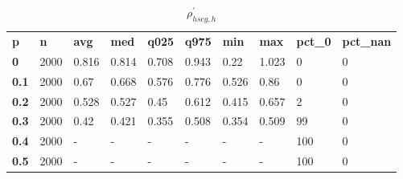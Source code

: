 \begin{table}[h]
 \centering 
\footnotesize
\caption{$\rho_{hscg,h}^\prime $}
\label{tab:alphahscgh}
\begin{tabular}[h]{| l l l l l l l l l l|
    } \hline
\textbf{ p} & \textbf{ n} & \textbf{ avg} & \textbf{ med} & \textbf{ q025} & \textbf{ q975} & \textbf{ min} & \textbf{ max} & \textbf{ pct\_0} & \textbf{ pct\_nan}
           \\
  \textbf{  0} & 2000 & 0.816 & 0.814 & 0.708 & 0.943 &  0.22 & 1.023 &   0 & 0
           \\
  \textbf{0.1} & 2000 &  0.67 & 0.668 & 0.576 & 0.776 & 0.526 &  0.86 &   0 & 0
           \\
  \textbf{0.2} & 2000 & 0.528 & 0.527 &  0.45 & 0.612 & 0.415 & 0.657 &   2 & 0
           \\
  \textbf{0.3} & 2000 &  0.42 & 0.421 & 0.355 & 0.508 & 0.354 & 0.509 &  99 & 0
           \\
  \textbf{0.4} & 2000 & - & - & - & - & - & - & 100 & 0
           \\
  \textbf{0.5} & 2000 & - & - & - & - & - & - & 100 & 0
           \\
 \hline \end{tabular}
 \end{table}
